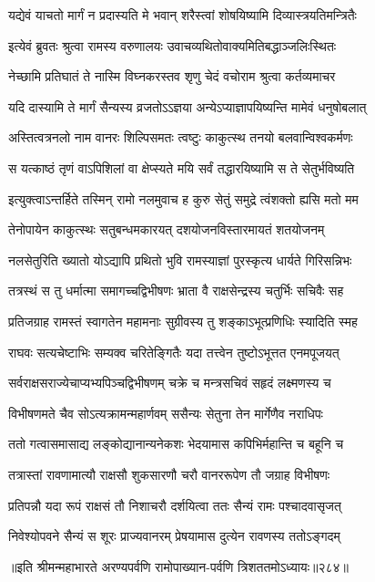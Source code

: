 \twolineshloka
{यद्येवं याचतो मार्गं न प्रदास्यति मे भवान्}
{शरैस्त्वां शोषयिष्यामि दिव्यास्त्रयतिमन्त्रितैः}


\twolineshloka
{इत्येवं ब्रुवतः श्रुत्वा रामस्य वरुणालयः}
{उवाचव्यथितोवाक्यमितिबद्धाञ्जलिःस्थितः}


\twolineshloka
{नेच्छामि प्रतिघातं ते नास्मि विघ्नकरस्तव}
{शृणु चेदं वचोराम श्रुत्वा कर्तव्यमाचर}


\twolineshloka
{यदि दास्यामि ते मार्गं सैन्यस्य व्रजतोऽऽज्ञया}
{अन्येऽप्याज्ञापयिष्यन्ति मामेवं धनुषोबलात्}


\twolineshloka
{अस्तित्वत्रनलो नाम वानरः शिल्पिसमतः}
{त्वष्टुः काकुत्स्थ तनयो बलवान्विश्वकर्मणः}


\twolineshloka
{स यत्काष्ठं तृणं वाऽपिशिलां वा क्षेप्स्यते मयि}
{सर्वं तद्धारयिष्यामि स ते सेतुर्भविष्यति}


\twolineshloka
{इत्युक्त्वाऽन्तर्हिते तस्मिन् रामो नलमुवाच ह}
{कुरु सेतुं समुद्रे त्वंशक्तो ह्यसि मतो मम}


\twolineshloka
{तेनोपायेन काकुत्स्थः सतुबन्धमकारयत्}
{दशयोजनविस्तारमायतं शतयोजनम्}


\twolineshloka
{नलसेतुरिति ख्यातो योऽद्यापि प्रथितो भुवि}
{रामस्याज्ञां पुरस्कृत्य धार्यते गिरिसन्निभः}


\twolineshloka
{तत्रस्थं स तु धर्मात्मा समागच्चद्विभीषणः}
{भ्राता वै राक्षसेन्द्रस्य चतुर्भिः सचिवैः सह}


\twolineshloka
{प्रतिजग्राह रामस्तं स्वागतेन महामनाः}
{सुग्रीवस्य तु शङ्काऽभूत्प्रणिधिः स्यादिति स्मह}


\twolineshloka
{राघवः सत्यचेष्टाभिः सम्यक्व चरितेङ्गितैः}
{यदा तत्त्वेन तुष्टोऽभूत्तत एनमपूजयत्}


\twolineshloka
{सर्वराक्षसराज्येचाप्यभ्यपिञ्चद्विभीषणम्}
{चक्रे च मन्त्रसचिवं सहृदं लक्ष्मणस्य च}


\twolineshloka
{विभीषणमते चैव सोऽत्यक्रामन्महार्णवम्}
{ससैन्यः सेतुना तेन मार्गेणैव नराधिपः}


\twolineshloka
{ततो गत्वासमासाद्य लङ्कोद्यानान्यनेकशः}
{भेदयामास कपिभिर्महान्ति च बहूनि च}


\twolineshloka
{तत्रास्तां रावणामात्यौ राक्षसौ शुकसारणौ}
{चरौ वानररूपेण तौ जग्राह विभीषणः}


\twolineshloka
{प्रतिपन्नौ यदा रूपं राक्षसं तौ निशाचरौ}
{दर्शयित्वा ततः सैन्यं रामः पश्चादवासृजत्}


\twolineshloka
{निवेश्योपवने सैन्यं स शूरः प्राज्यवानरम्}
{प्रेषयामास दुत्येन रावणस्य ततोऽङ्गदम्}


॥इति श्रीमन्महाभारते अरण्यपर्वणि रामोपाख्यान-पर्वणि त्रिशततमोऽध्यायः॥२८४॥

